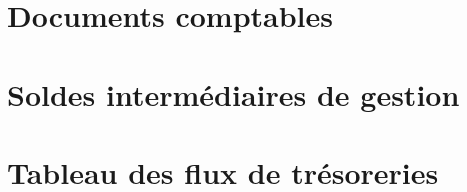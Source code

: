 \documentclass[ebook,9pt,openany,final,french]{memoir}
\begin{document}
\pagestyle{pageStyle}

\frontmatter


\mainmatter
\setglobalstyles






\begin{appendices}

\begingroup

\titlespacing*{\chapter}{0pt}{-15pt}{0pt}

\chapter{Documents comptables}





\chapter{Soldes intermédiaires de gestion}
\label{chapter:sig}


\chapter{Tableau des flux de trésoreries}






\endgroup

\end{appendices}


\backmatter

\end{document}
